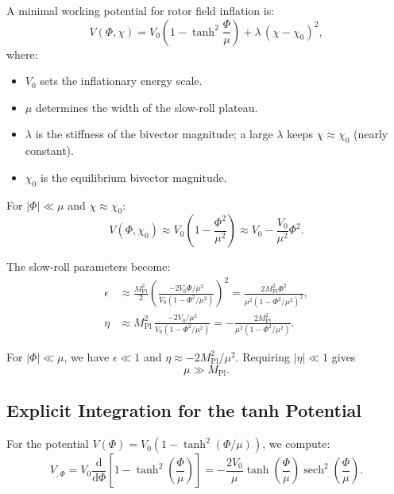 \documentclass[11pt,a4paper]{article}
\numberwithin{equation}{section}
\theoremstyle{plain}
\theoremstyle{definition}
\theoremstyle{remark}
\newcommand{\dd}{\mathrm{d}}
\begin{document}
A minimal working potential for rotor field inflation is:
\begin{equation}
V(\Phi,\chi) = V_0\left(1 - \tanh^2\frac{\Phi}{\mu}\right) + \lambda\,(\chi - \chi_0)^2,
\label{eq:potential}
\end{equation}
where:
\begin{itemize}
  \item $V_0$ sets the inflationary energy scale.
  \item $\mu$ determines the width of the slow-roll plateau.
  \item $\lambda$ is the stiffness of the bivector magnitude; a large $\lambda$ keeps $\chi \approx \chi_0$ (nearly constant).
  \item $\chi_0$ is the equilibrium bivector magnitude.
\end{itemize}

For $|\Phi| \ll \mu$ and $\chi \approx \chi_0$:
\begin{equation}
V(\Phi,\chi_0) \approx V_0\left(1 - \frac{\Phi^2}{\mu^2}\right) \approx V_0 - \frac{V_0}{\mu^2}\Phi^2.
\end{equation}

The slow-roll parameters become:
\begin{align}
\epsilon &\approx \frac{M_{\mathrm{Pl}}^2}{2}\left(\frac{-2V_0\Phi/\mu^2}{V_0(1-\Phi^2/\mu^2)}\right)^2 = \frac{2M_{\mathrm{Pl}}^2\Phi^2}{\mu^2(1-\Phi^2/\mu^2)^2},\\
\eta &\approx M_{\mathrm{Pl}}^2\,\frac{-2V_0/\mu^2}{V_0(1-\Phi^2/\mu^2)} = -\frac{2M_{\mathrm{Pl}}^2}{\mu^2(1-\Phi^2/\mu^2)}.
\end{align}

For $|\Phi| \ll \mu$, we have $\epsilon \ll 1$ and $\eta \approx -2M_{\mathrm{Pl}}^2/\mu^2$. Requiring $|\eta| \ll 1$ gives
\begin{equation}
\mu \gg M_{\mathrm{Pl}}.
\label{eq:mu-constraint}
\end{equation}

\subsection{Explicit Integration for the tanh Potential}

For the potential $V(\Phi) = V_0(1 - \tanh^2(\Phi/\mu))$, we compute:
\begin{equation}
V_{,\Phi} = V_0\frac{\dd}{\dd\Phi}\left[1 - \tanh^2\left(\frac{\Phi}{\mu}\right)\right] = -\frac{2V_0}{\mu}\tanh\left(\frac{\Phi}{\mu}\right)\operatorname{sech}^2\left(\frac{\Phi}{\mu}\right).
\end{equation}
\end{document}
